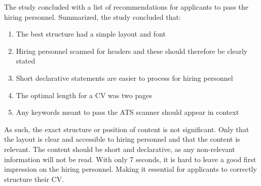 The study concluded with a list of recommendations for applicants to pass the hiring personnel.
Summarized, the study concluded that: \\
\begin{enumerate}
   \item  The best structure had a simple layout and font
   \item  Hiring personnel scanned for headers and these should therefore be clearly stated
   \item  Short declarative statements are easier to process for hiring personnel
   \item  The optimal length for a CV was two pages
   \item  Any keywords meant to pass the ATS scanner should appear in context \\
\end{enumerate} 
As such, the exact structure or position of content is not significant.
Only that the layout is clear and accessible to hiring personnel and that the content is relevant.
The content should be short and declarative, as any non-relevant information will not be read.
With only 7 seconds, it is hard to leave a good first impression on the hiring personnel.
Making it essential for applicants to correctly structure their CV.
\clearpage
